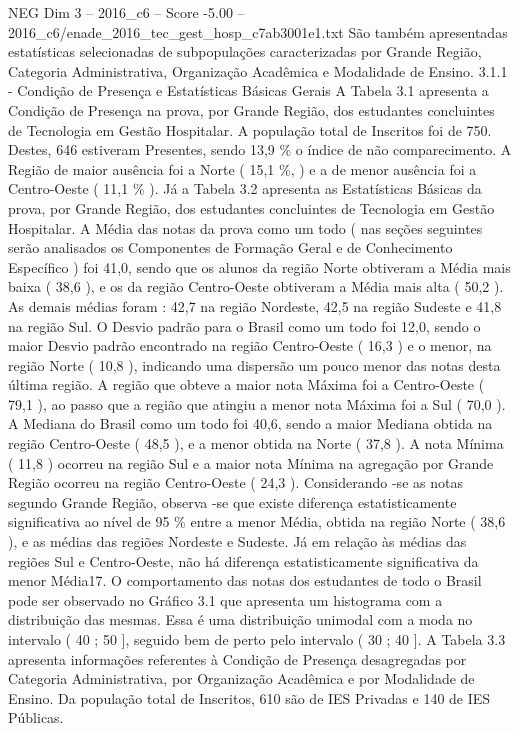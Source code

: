 \begin{textsample}{NEG Dim 3 – 2016\_c6 – Score -5.00 – 2016\_c6/enade\_2016\_tec\_gest\_hosp\_c7ab3001e1.txt}
São também apresentadas estatísticas selecionadas de subpopulações caracterizadas por Grande Região, Categoria Administrativa, Organização Acadêmica e Modalidade de Ensino. 3.1.1 - Condição de Presença e Estatísticas Básicas Gerais A Tabela 3.1 apresenta a Condição de Presença na prova, por Grande Região, dos estudantes concluintes de Tecnologia em Gestão Hospitalar.
A população total de Inscritos foi de 750.
Destes, 646 estiveram Presentes, sendo 13,9 \% o índice de não comparecimento.
A Região de maior ausência foi a Norte ( 15,1 \%, ) e a de menor ausência foi a Centro-Oeste ( 11,1 \% ).
Já a Tabela 3.2 apresenta as Estatísticas Básicas da prova, por Grande Região, dos estudantes concluintes de Tecnologia em Gestão Hospitalar.
A Média das notas da prova como um todo ( nas seções seguintes serão analisados os Componentes de Formação Geral e de Conhecimento Específico ) foi 41,0, sendo que os alunos da região Norte obtiveram a Média mais baixa ( 38,6 ), e os da região Centro-Oeste obtiveram a Média mais alta ( 50,2 ).
As demais médias foram : 42,7 na região Nordeste, 42,5 na região Sudeste e 41,8 na região Sul.
O Desvio padrão para o Brasil como um todo foi 12,0, sendo o maior Desvio padrão encontrado na região Centro-Oeste ( 16,3 ) e o menor, na região Norte ( 10,8 ), indicando uma dispersão um pouco menor das notas desta última região.
A região que obteve a maior nota Máxima foi a Centro-Oeste ( 79,1 ), ao passo que a região que atingiu a menor nota Máxima foi a Sul ( 70,0 ).
A Mediana do Brasil como um todo foi 40,6, sendo a maior Mediana obtida na região Centro-Oeste ( 48,5 ), e a menor obtida na Norte ( 37,8 ).
A nota Mínima ( 11,8 ) ocorreu na região Sul e a maior nota Mínima na agregação por Grande Região ocorreu na região Centro-Oeste ( 24,3 ).
Considerando -se as notas segundo Grande Região, observa -se que existe diferença estatisticamente significativa ao nível de 95 \% entre a menor Média, obtida na região Norte ( 38,6 ), e as médias das regiões Nordeste e Sudeste.
Já em relação às médias das regiões Sul e Centro-Oeste, não há diferença estatisticamente significativa da menor Média17.
O comportamento das notas dos estudantes de todo o Brasil pode ser observado no Gráfico 3.1 que apresenta um histograma com a distribuição das mesmas.
Essa é uma distribuição unimodal com a moda no intervalo ( 40 ; 50 ], seguido bem de perto pelo intervalo ( 30 ; 40 ].
A Tabela 3.3 apresenta informações referentes à Condição de Presença desagregadas por Categoria Administrativa, por Organização Acadêmica e por Modalidade de Ensino.
Da população total de Inscritos, 610 são de IES Privadas e 140 de IES Públicas.

\end{textsample}
